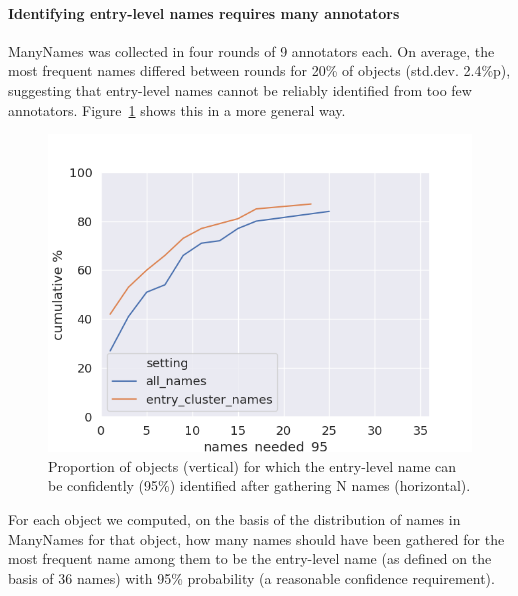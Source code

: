 

\paragraph{Identifying entry-level names requires many annotators}
ManyNames was collected in four rounds of 9 annotators each.
On average, the most frequent names differed between rounds for 20\% of objects (std.dev. 2.4\%p), suggesting that entry-level names cannot be reliably identified from too few annotators.
Figure~\ref{fig:entry-level-name-stability} shows this in a more general way.
\begin{figure}[t]
	\includegraphics[width=\columnwidth]{images/stability_analytic.png}
	\caption{Proportion of objects (vertical) for which the entry-level name can be confidently (95\%) identified after gathering N names (horizontal). }
	\label{fig:entry-level-name-stability}
\end{figure}
For each object we computed, on the basis of the distribution of names in ManyNames for that object, how many names should have been gathered for the most frequent name among them to be the entry-level name (as defined on the basis of 36 names) with 95\% probability (a reasonable confidence requirement).
